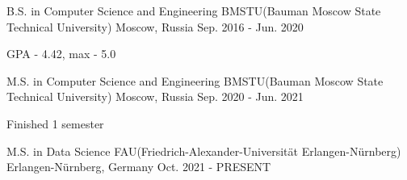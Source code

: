 

\begin{cventries}

  \cventry
    {B.S. in Computer Science and Engineering} %
    {BMSTU(Bauman Moscow State Technical University)} %
    {Moscow, Russia} %
    {Sep. 2016 - Jun. 2020} %
    {
      \begin{cvitems} %
        \item {GPA - 4.42, max - 5.0}
      \end{cvitems}
    }

  \cventry
    {M.S. in Computer Science and Engineering} %
    {BMSTU(Bauman Moscow State Technical University)} %
    {Moscow, Russia} %
    {Sep. 2020 - Jun. 2021} %
    {
      \begin{cvitems} %
        \item {Finished 1 semester}
      \end{cvitems}
    }
  \cventry
    {M.S. in Data Science} %
    {FAU(Friedrich-Alexander-Universität Erlangen-Nürnberg)} %
    {Erlangen-Nürnberg, Germany} %
    {Oct. 2021 - PRESENT} %
    {}

\end{cventries}
